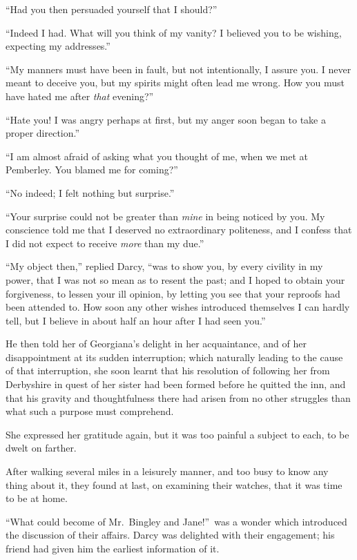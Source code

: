 \documentclass[12pt,english]{book}
\begin{document}
{}``Had you then persuaded yourself that I should?''\ 

{}``Indeed I had. What will you think of my vanity? I believed you
to be wishing, expecting my addresses.''

{}``My manners must have been in fault, but not intentionally, I
assure you. I never meant to deceive you, but my spirits might often
lead me wrong. How you must have hated me after \textit{that} evening?''\ 

{}``Hate you! I was angry perhaps at first, but my anger soon began
to take a proper direction.''

{}``I am almost afraid of asking what you thought of me, when we
met at Pemberley. You blamed me for coming?''\ 

{}``No indeed; I felt nothing but surprise.''

{}``Your surprise could not be greater than \textit{mine} in being
noticed by you. My conscience told me that I deserved no extraordinary
politeness, and I confess that I did not expect to receive \textit{more}
than my due.''

{}``My object then,'' replied Darcy, {}``was to show you, by every
civility in my power, that I was not so mean as to resent the past;
and I hoped to obtain your forgiveness, to lessen your ill opinion,
by letting you see that your reproofs had been attended to. How soon
any other wishes introduced themselves I can hardly tell, but I believe
in about half an hour after I had seen you.''

He then told her of Georgiana's delight in her acquaintance, and of
her disappointment at its sudden interruption; which naturally leading
to the cause of that interruption, she soon learnt that his resolution
of following her from Derbyshire in quest of her sister had been formed
before he quitted the inn, and that his gravity and thoughtfulness
there had arisen from no other struggles than what such a purpose
must comprehend.

She expressed her gratitude again, but it was too painful a subject
to each, to be dwelt on farther.

After walking several miles in a leisurely manner, and too busy to
know any thing about it, they found at last, on examining their watches,
that it was time to be at home.

{}``What could become of Mr.\ Bingley and Jane!''\ was a wonder
which introduced the discussion of their affairs. Darcy was delighted
with their engagement; his friend had given him the earliest information
of it.
\end{document}
